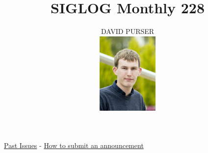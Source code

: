 \documentclass[prodmode,acmtecs]{acmsmall} %
\newcounter{colstart}
\begin{document}
\setcounter{colstart}{\thepage}

\title{\huge\sc SIGLOG Monthly 228}
\author{DAVID PURSER
\vspace*{-2.6cm}\begin{flushright}\includegraphics[width=30mm]{dp}\end{flushright}
}

\maketitlee

\href{https://lics.siglog.org/newsletters/}{Past Issues}
 - 
\href{https://lics.siglog.org/newsletters/inst.html}{How to submit an announcement}
\end{document}
